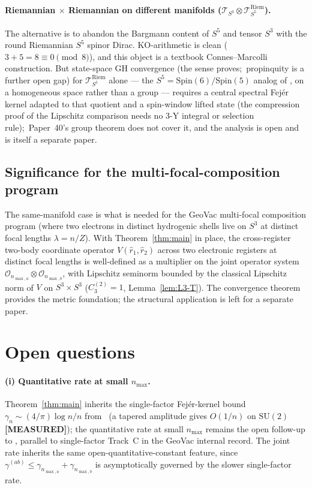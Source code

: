 \documentclass[11pt,a4paper]{article}
\theoremstyle{plain}
\theoremstyle{definition}
\newcommand{\nmax}{n_{\max}}
\newcommand{\nmaxa}{n_{\max,a}}
\newcommand{\nmaxb}{n_{\max,b}}
\newcommand{\sthree}{S^{3}}
\newcommand{\Op}{\mathcal{O}}
\newcommand{\Tcal}{\mathcal{T}}
\newcommand{\SU}{\mathrm{SU}}
\begin{document}
\paragraph{Riemannian $\times$ Riemannian on different manifolds
($\Tcal_{\sthree} \otimes \Tcal_{S^5}^{\mathrm{Riem}}$).}
The alternative is to abandon the Bargmann content of $S^5$ and tensor
$\sthree$ with the round Riemannian $S^5$ spinor Dirac. KO-arithmetic
is clean ($3 + 5 = 8 \equiv 0 \pmod 8$), and this object is a
textbook Connes--Marcolli construction. But state-space GH convergence
(the sense \cite{loutey_paper38} proves;\ propinquity is a further open
gap) for $\Tcal_{S^5}^{\mathrm{Riem}}$ alone --- the
$S^5 = \mathrm{Spin}(6)/\mathrm{Spin}(5)$ analog of \cite{loutey_paper38},
on a homogeneous space rather than a group --- requires a central
spectral Fej\'er kernel adapted to that quotient and a spin-window
lifted state (the compression proof of the Lipschitz comparison needs
no 3-Y integral or selection rule);\ Paper~40's group theorem does not
cover it, and the analysis is open and is itself a separate paper.

\subsection{Significance for the multi-focal-composition program}
\label{sec:significance}

The same-manifold case is what is needed for the GeoVac multi-focal
composition program (where two electrons in distinct hydrogenic shells
live on $\sthree$ at distinct focal lengths $\lambda = n/Z$). With
Theorem~\ref{thm:main} in place, the cross-register two-body coordinate
operator $V(\hat r_1, \hat r_2)$ across two electronic registers at
distinct focal lengths is well-defined as a multiplier on the joint
operator system $\Op_{\nmaxa} \otimes \Op_{\nmaxb}$, with
Lipschitz seminorm bounded by the classical Lipschitz norm of $V$ on
$\sthree \times \sthree$ ($C_3^{(2)} = 1$, Lemma~\ref{lem:L3-T}). The convergence theorem provides the metric foundation; the
structural application is left for a separate paper.

\section{Open questions}\label{sec:open}

\paragraph{(i) Quantitative rate at small $\nmax$.} Theorem~\ref{thm:main}
inherits the single-factor Fej\'er-kernel bound
$\gamma_n \sim (4/\pi) \log n / n$ from~\cite{loutey_paper38} (a tapered amplitude gives $O(1/n)$ on $\SU(2)$ \textbf{[MEASURED]}); the
quantitative rate at small $\nmax$ remains the open follow-up to
\cite[\S 5(i)]{loutey_paper38}, parallel to single-factor Track~C in
the GeoVac internal record. The joint rate inherits the same
open-quantitative-constant feature, since
$\gamma^{(ab)} \le \gamma_{\nmaxa} + \gamma_{\nmaxb}$ is asymptotically
governed by the slower single-factor rate.
\end{document}
